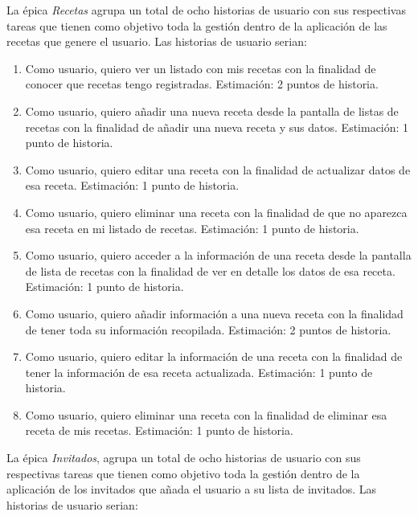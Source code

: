 La épica \textit{Recetas} agrupa un total de ocho historias de usuario con sus respectivas tareas que tienen como objetivo toda la gestión dentro de la aplicación de las recetas que genere el usuario. Las historias de usuario serian:

\begin{enumerate}
  \item Como usuario, quiero ver un listado con mis recetas con la finalidad de conocer que recetas tengo registradas. Estimación: 2 puntos de historia.
  \item Como usuario, quiero añadir una nueva receta desde la pantalla de listas de recetas con la finalidad de añadir una nueva receta y sus datos. Estimación: 1 punto de historia.
  \item Como usuario, quiero editar una receta con la finalidad de actualizar datos de esa receta. Estimación: 1 punto de historia.
  \item Como usuario, quiero eliminar una receta con la finalidad de que no aparezca esa receta en mi listado de recetas. Estimación: 1 punto de historia.
  \item Como usuario, quiero acceder a la información de una receta desde la pantalla de lista de recetas con la finalidad de ver en detalle los datos de esa receta. Estimación: 1 punto de historia.
  \item Como usuario, quiero añadir información a una nueva receta con la finalidad de tener toda su información recopilada. Estimación: 2 puntos de historia.
  \item Como usuario, quiero editar la información de una receta con la finalidad de tener la información de esa receta actualizada. Estimación: 1 punto de historia.
  \item Como usuario, quiero eliminar una receta con la finalidad de eliminar esa receta de mis recetas. Estimación: 1 punto de historia.
\end{enumerate}

La épica \textit{Invitados}, agrupa un total de ocho historias de usuario con sus respectivas tareas que tienen como objetivo toda la gestión dentro de la aplicación de los invitados que añada el usuario a su lista de invitados. Las historias de usuario serian:

